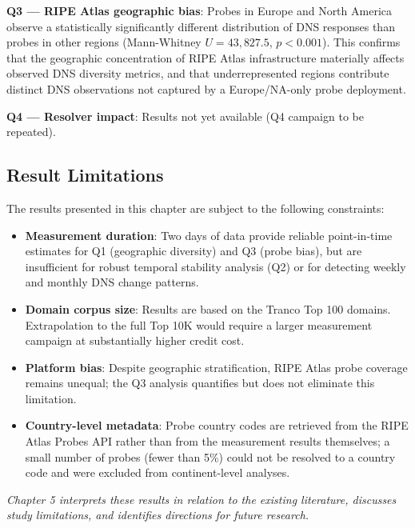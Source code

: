 \textbf{Q3 --- RIPE Atlas geographic bias}: Probes in Europe and North America observe a statistically significantly different distribution of DNS responses than probes in other regions (Mann-Whitney $U = 43{,}827.5$, $p < 0.001$). This confirms that the geographic concentration of RIPE Atlas infrastructure materially affects observed DNS diversity metrics, and that underrepresented regions contribute distinct DNS observations not captured by a Europe/NA-only probe deployment.

\textbf{Q4 --- Resolver impact}: Results not yet available (Q4 campaign to be repeated).

\subsection{Result Limitations}
\label{subsec:4.6.2}

The results presented in this chapter are subject to the following constraints:

\begin{itemize}
  \item \textbf{Measurement duration}: Two days of data provide reliable point-in-time estimates for Q1 (geographic diversity) and Q3 (probe bias), but are insufficient for robust temporal stability analysis (Q2) or for detecting weekly and monthly DNS change patterns.
  \item \textbf{Domain corpus size}: Results are based on the Tranco Top 100 domains. Extrapolation to the full Top 10K would require a larger measurement campaign at substantially higher credit cost.
  \item \textbf{Platform bias}: Despite geographic stratification, RIPE Atlas probe coverage remains unequal; the Q3 analysis quantifies but does not eliminate this limitation.
  \item \textbf{Country-level metadata}: Probe country codes are retrieved from the RIPE Atlas Probes API rather than from the measurement results themselves; a small number of probes (fewer than 5\%) could not be resolved to a country code and were excluded from continent-level analyses.
\end{itemize}
\bigskip
\textit{Chapter 5 interprets these results in relation to the existing literature, discusses study limitations, and identifies directions for future research.}
